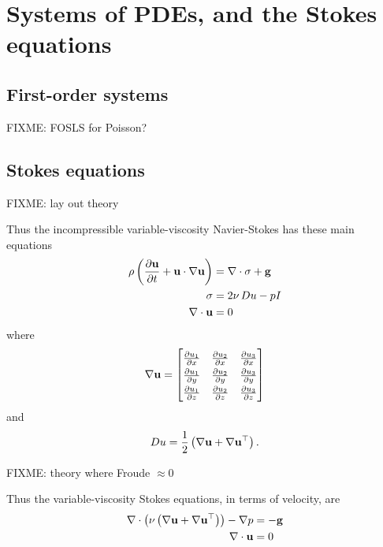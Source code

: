 
\chapter{Systems of PDEs, and the Stokes equations}
\label{chap:stokes}

\section{First-order systems}

FIXME: FOSLS for Poisson?

\section{Stokes equations}

FIXME: lay out theory 

Thus the incompressible variable-viscosity Navier-Stokes has these main equations
\begin{align*}
\rho \left(\frac{\partial \mathbf{u}}{\partial t} + \mathbf{u} \cdot \nabla \mathbf{u}\right) &= \nabla\cdot \sigma + \mathbf{g} \\
\sigma &= 2 \nu\, Du - p I \\
\nabla\cdot \mathbf{u} &= 0
\end{align*}
where
  $$\grad \bu = \renewcommand{\arraystretch}{1.3}\begin{bmatrix}
    \frac{\partial u_1}{\partial x} & \frac{\partial u_2}{\partial x} & \frac{\partial u_3}{\partial x} \\
    \frac{\partial u_1}{\partial y} & \frac{\partial u_2}{\partial y} & \frac{\partial u_3}{\partial y} \\
    \frac{\partial u_1}{\partial z} & \frac{\partial u_2}{\partial z} & \frac{\partial u_3}{\partial z}
    \end{bmatrix}$$
and
    $$D u = \frac{1}{2} \left(\nabla \mathbf{u} + \nabla \mathbf{u}^{\top}\right).$$

FIXME: theory where Froude $\approx 0$

Thus the variable-viscosity Stokes equations, in terms of velocity, are
\begin{align*}
\nabla\cdot \left(\nu \left(\nabla \mathbf{u} + \nabla \mathbf{u}^{\top}\right)\right) - \nabla p &= - \mathbf{g} \\
\nabla\cdot \mathbf{u} &= 0
\end{align*}

